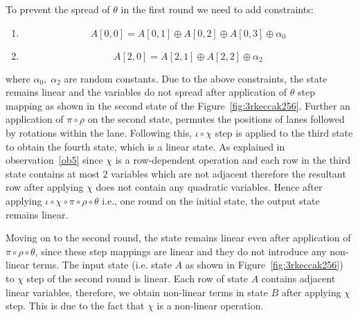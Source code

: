 \noindent To prevent the spread of $\theta$ in the first round we need to add constraints:
\begin{enumerate}
\item \[
        A[0,0] = A[0,1] \oplus A[0,2] \oplus A[0,3] \oplus \alpha_0
    \]
\item \[
        A[2,0] = A[2,1] \oplus A[2,2] \oplus \alpha_2
    \]
\end{enumerate}
where $\alpha_0,\; \alpha_2$ are random constants.
Due to the above constraints, the state remains linear and the variables do not spread after application of $\theta$ step mapping as shown in the second state of the Figure~\ref{fig:3rkeccak256}. 
Further an application of $\pi \circ \rho$ on the second state, permutes the positions of lanes followed by rotations within the lane. 
Following this, $\iota \circ \chi$ step is applied to the third state to obtain the fourth state, which is a linear state. 
As explained in observation~\ref{ob5} since $\chi$ is a row-dependent operation and each row in the third state contains at most $2$ variables which are not adjacent therefore the resultant row after applying $\chi$ does not contain any quadratic variables.
Hence after applying $\iota \circ \chi \circ \pi \circ \rho \circ \theta $ i.e., one round on the initial state, the output state remains linear.

Moving on to the second round, the state remains linear even after application of $\pi \circ \rho \circ \theta$, since these step mappings are linear and they do not introduce any non-linear terms. The input state (i.e. state $A$ as shown in Figure~\ref{fig:3rkeccak256}) to $\chi$ step of the second round is linear. Each row of state $A$ contains adjacent linear variables, therefore, we obtain non-linear terms in state $B$ after applying $\chi$ step. This is due to the fact that $\chi$ is a non-linear operation.


